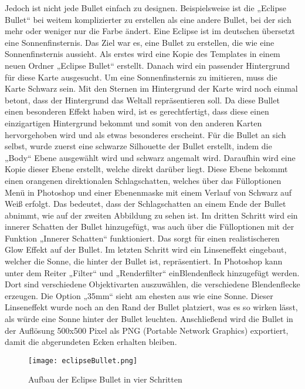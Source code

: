 Jedoch ist nicht jede Bullet einfach zu designen. Beispielsweise ist die „Eclipse Bullet“ bei weitem komplizierter zu erstellen als eine andere Bullet, bei der sich mehr oder weniger nur die Farbe ändert. Eine Eclipse ist im deutschen übersetzt eine Sonnenfinsternis. Das Ziel war es, eine Bullet zu erstellen, die wie eine Sonnenfinsternis aussieht.  Als erstes wird eine Kopie des Templates in einem neuen Ordner „Eclipse Bullet“ erstellt. Danach wird ein passender Hintergrund für diese Karte ausgesucht. Um eine Sonnenfinsternis zu imitieren, muss die Karte Schwarz sein. Mit den Sternen im Hintergrund der Karte wird noch einmal betont, dass der Hintergrund das Weltall repräsentieren soll. Da diese Bullet einen besonderen Effekt haben wird, ist es gerechtfertigt, dass diese einen einzigartigen Hintergrund bekommt und somit von den anderen Karten hervorgehoben wird und als etwas besonderes erscheint. Für die Bullet an sich selbst, wurde zuerst eine schwarze Silhouette der Bullet erstellt, indem die „Body“ Ebene ausgewählt wird und schwarz angemalt wird. Daraufhin wird eine Kopie dieser Ebene erstellt, welche direkt darüber liegt. Diese Ebene bekommt einen orangenen direktionalen Schlagschatten, welches über das Fülloptionen Menü in Photoshop und einer Ebenenmaske mit einem Verlauf von Schwarz auf Weiß erfolgt. Das bedeutet, dass der Schlagschatten an einem Ende der Bullet abnimmt, wie auf der zweiten Abbildung zu sehen ist. Im dritten Schritt wird ein innerer Schatten der Bullet hinzugefügt, was auch über die Fülloptionen mit der Funktion „Innerer Schatten“ funktioniert. Das sorgt für einen realistischeren Glow Effekt auf der Bullet. Im letzten Schritt wird ein Linseneffekt eingebaut, welcher die Sonne, die hinter der Bullet ist, repräsentiert. In Photoshop kann unter dem Reiter „Filter“ und „Renderfilter“ einBlendenfleck hinzugefügt werden. Dort sind verschiedene Objektivarten auszuwählen, die verschiedene Blendenflecke erzeugen. Die Option „35mm“ sieht am ehesten aus wie eine Sonne. Dieser Linseneffekt wurde noch an den Rand der Bullet platziert, was es so wirken lässt, als würde eine Sonne hinter der Bullet leuchten. Anschließend wird die Bullet in der Auflösung 500x500 Pixel als PNG (Portable Network Graphics) exportiert, damit die abgerundeten Ecken erhalten bleiben.

\begin{figure}[H]
    \centering
    \texttt{[image: eclipseBullet.png]}
    \caption{Aufbau der Eclipse Bullet in vier Schritten}
\end{figure}
